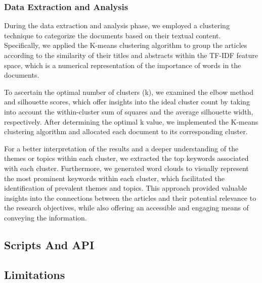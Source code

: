\subsubsection{Data Extraction and Analysis}
During the data extraction and analysis phase, we employed a clustering technique to categorize the documents based on their textual content. Specifically, we applied the K-means clustering algorithm to group the articles according to the similarity of their titles and abstracts within the TF-IDF feature space, which is a numerical representation of the importance of words in the documents.

To ascertain the optimal number of clusters (k), we examined the elbow method and silhouette scores, which offer insights into the ideal cluster count by taking into account the within-cluster sum of squares and the average silhouette width, respectively. After determining the optimal k value, we implemented the K-means clustering algorithm and allocated each document to its corresponding cluster.

For a better interpretation of the results and a deeper understanding of the themes or topics within each cluster, we extracted the top keywords associated with each cluster. Furthermore, we generated word clouds to visually represent the most prominent keywords within each cluster, which facilitated the identification of prevalent themes and topics. This approach provided valuable insights into the connections between the articles and their potential relevance to the research objectives, while also offering an accessible and engaging means of conveying the information.
\subsection{Scripts And API}

\subsection{Limitations}